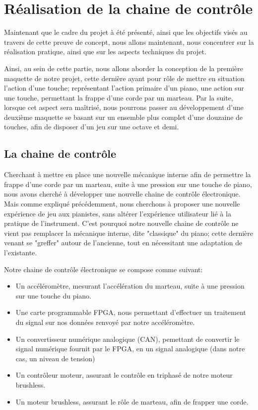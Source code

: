 \documentclass[french,a4paper,12pt]{report}
\begin{document}
	\part{Réalisation de la chaine de contrôle}	
	
	Maintenant que le cadre du projet à été présenté, ainsi que les objectifs visés au travers de cette preuve de concept, nous allons maintenant, nous concentrer sur la réalisation pratique, ainsi que sur les aspects techniques du projet.
	
	Ainsi, au sein de cette partie, nous allons aborder la conception de la première maquette de notre projet, cette dernière ayant pour rôle de mettre en situation l'action d'une touche; représentant l'action primaire d'un piano, une action sur une touche, permettant la frappe d'une corde par un marteau. Par la suite, lorsque cet aspect sera maîtrisé, nous pourrons passer au développement d'une deuxième maquette se basant sur un ensemble plus complet d'une douzaine de touches, afin de disposer d'un jeu sur une octave et demi.
	
		\chapter{La chaine de contrôle}
		
		Cherchant à mettre en place une nouvelle mécanique interne afin de permettre la frappe d'une corde par un marteau, suite à une pression sur une touche de piano, nous avons cherché à développer une nouvelle chaine de contrôle électronique.
		Mais comme expliqué précédemment, nous cherchons à proposer une nouvelle expérience de jeu aux pianistes, sans altérer l'expérience utilisateur lié à la pratique de l'instrument. C'est pourquoi notre nouvelle chaine de contrôle ne vient pas remplacer la mécanique interne, dite "classique" du piano; cette dernière venant se "greffer" autour de l'ancienne, tout en nécessitant une adaptation de l'existante.
		
		Notre chaine de contrôle électronique se compose comme suivant:
		\begin{itemize}
			\item Un accéléromètre, mesurant l'accélération du marteau, suite à une pression sur une touche du piano.
			\item Une carte programmable FPGA, nous permettant d'effectuer un traitement du signal sur nos données renvoyé par notre accéléromètre.
			\item Un convertisseur numérique analogique (CAN), pemettant de convertir le signal numérique fournit par le FPGA, en un signal analogique (dans notre cas, un niveau de tension)
			\item Un contrôleur moteur, assurant le contrôle en triphasé de notre moteur brushless.
			\item Un moteur brushless, assurant le rôle de marteau, afin de frapper une corde.
		\end{itemize}
		
\end{document}
